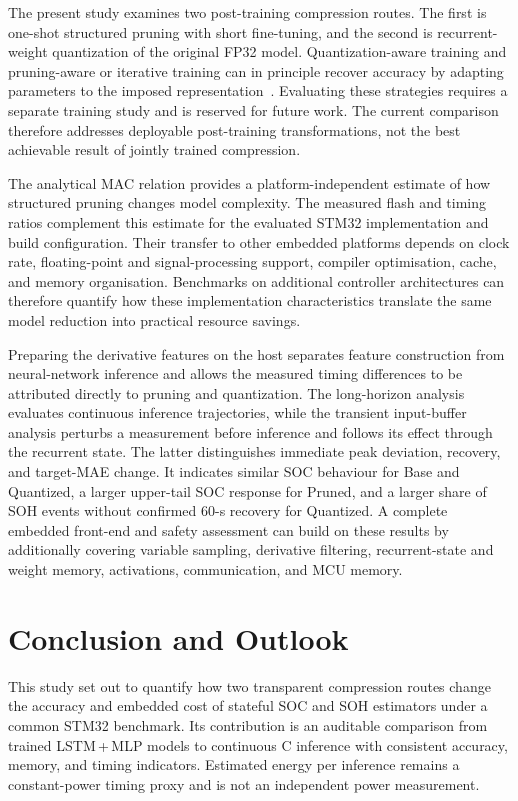 \documentclass[final,3p,times]{elsarticle}
\begin{document}
The present study examines two post-training compression routes. The first is one-shot structured pruning with short fine-tuning, and the second is recurrent-weight quantization of the original FP32 model. Quantization-aware training and pruning-aware or iterative training can in principle recover accuracy by adapting parameters to the imposed representation~\cite{krishnamoorthiQuantizingDeepConvolutional2018,wenLearningIntrinsicSparse2017}. Evaluating these strategies requires a separate training study and is reserved for future work. The current comparison therefore addresses deployable post-training transformations, not the best achievable result of jointly trained compression.

The analytical MAC relation provides a platform-independent estimate of how structured pruning changes model complexity. The measured flash and timing ratios complement this estimate for the evaluated STM32 implementation and build configuration. Their transfer to other embedded platforms depends on clock rate, floating-point and signal-processing support, compiler optimisation, cache, and memory organisation. Benchmarks on additional controller architectures can therefore quantify how these implementation characteristics translate the same model reduction into practical resource savings.

Preparing the derivative features on the host separates feature construction from neural-network inference and allows the measured timing differences to be attributed directly to pruning and quantization. The long-horizon analysis evaluates continuous inference trajectories, while the transient input-buffer analysis perturbs a measurement before inference and follows its effect through the recurrent state. The latter distinguishes immediate peak deviation, recovery, and target-MAE change. It indicates similar SOC behaviour for Base and Quantized, a larger upper-tail SOC response for Pruned, and a larger share of SOH events without confirmed 60-s recovery for Quantized. A complete embedded front-end and safety assessment can build on these results by additionally covering variable sampling, derivative filtering, recurrent-state and weight memory, activations, communication, and MCU memory.
\section{Conclusion and Outlook}
This study set out to quantify how two transparent compression routes change the accuracy and embedded cost of stateful SOC and SOH estimators under a common STM32 benchmark. Its contribution is an auditable comparison from trained LSTM\,+\,MLP models to continuous C inference with consistent accuracy, memory, and timing indicators. Estimated energy per inference remains a constant-power timing proxy and is not an independent power measurement.
\end{document}
